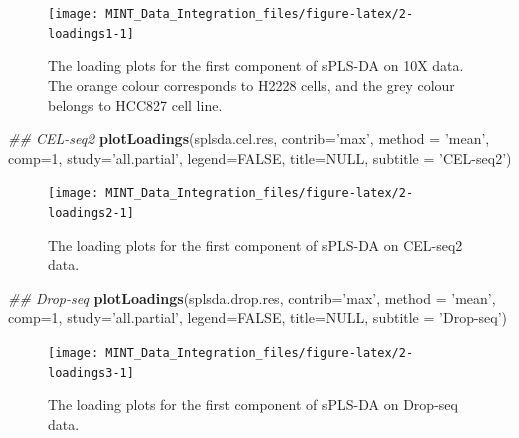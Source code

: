 \documentclass[]{book}
\newenvironment{Shaded}{\begin{snugshade}}{\end{snugshade}}
\newcommand{\CommentTok}[1]{\textcolor[rgb]{0.56,0.35,0.01}{\textit{#1}}}
\newcommand{\DataTypeTok}[1]{\textcolor[rgb]{0.13,0.29,0.53}{#1}}
\newcommand{\DecValTok}[1]{\textcolor[rgb]{0.00,0.00,0.81}{#1}}
\newcommand{\KeywordTok}[1]{\textcolor[rgb]{0.13,0.29,0.53}{\textbf{#1}}}
\newcommand{\NormalTok}[1]{#1}
\newcommand{\OtherTok}[1]{\textcolor[rgb]{0.56,0.35,0.01}{#1}}
\newcommand{\StringTok}[1]{\textcolor[rgb]{0.31,0.60,0.02}{#1}}
\theoremstyle{definition}
\theoremstyle{definition}
\theoremstyle{definition}
\theoremstyle{remark}
\begin{document}
\begin{figure}[ht]

{\centering \texttt{[image: MINT\_Data\_Integration\_files/figure-latex/2-loadings1-1]} 

}

\caption{The loading plots for the first component of sPLS-DA on 10X data. The orange colour corresponds to H2228 cells, and the grey colour belongs to HCC827 cell line.}\label{fig:2-loadings1}
\end{figure}

\begin{Shaded}
\begin{Highlighting}[]
\CommentTok{## CEL-seq2}
\KeywordTok{plotLoadings}\NormalTok{(splsda.cel.res, }\DataTypeTok{contrib=}\StringTok{'max'}\NormalTok{, }\DataTypeTok{method =} \StringTok{'mean'}\NormalTok{, }\DataTypeTok{comp=}\DecValTok{1}\NormalTok{, }
             \DataTypeTok{study=}\StringTok{'all.partial'}\NormalTok{, }\DataTypeTok{legend=}\OtherTok{FALSE}\NormalTok{, }\DataTypeTok{title=}\OtherTok{NULL}\NormalTok{,}
             \DataTypeTok{subtitle =} \StringTok{'CEL-seq2'}\NormalTok{)}
\end{Highlighting}
\end{Shaded}

\begin{figure}[ht]

{\centering \texttt{[image: MINT\_Data\_Integration\_files/figure-latex/2-loadings2-1]} 

}

\caption{The loading plots for the first component of sPLS-DA on CEL-seq2 data.}\label{fig:2-loadings2}
\end{figure}

\begin{Shaded}
\begin{Highlighting}[]
\CommentTok{## Drop-seq}
\KeywordTok{plotLoadings}\NormalTok{(splsda.drop.res, }\DataTypeTok{contrib=}\StringTok{'max'}\NormalTok{, }\DataTypeTok{method =} \StringTok{'mean'}\NormalTok{, }\DataTypeTok{comp=}\DecValTok{1}\NormalTok{, }
             \DataTypeTok{study=}\StringTok{'all.partial'}\NormalTok{, }\DataTypeTok{legend=}\OtherTok{FALSE}\NormalTok{, }\DataTypeTok{title=}\OtherTok{NULL}\NormalTok{,}
             \DataTypeTok{subtitle =} \StringTok{'Drop-seq'}\NormalTok{)}
\end{Highlighting}
\end{Shaded}

\begin{figure}[ht]

{\centering \texttt{[image: MINT\_Data\_Integration\_files/figure-latex/2-loadings3-1]} 

}

\caption{The loading plots for the first component of sPLS-DA on Drop-seq data.}\label{fig:2-loadings3}
\end{figure}
\end{document}
